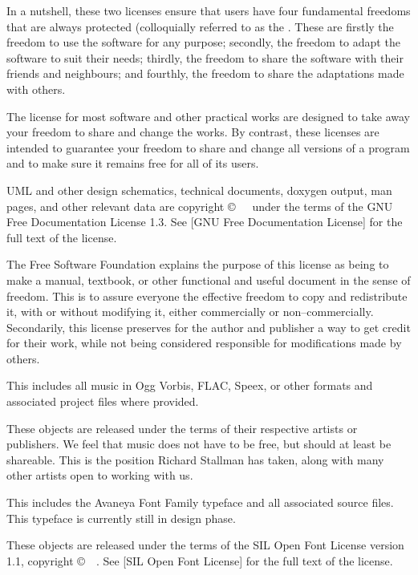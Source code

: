 In a nutshell, these two licenses ensure that users have four fundamental freedoms that are always protected (colloquially referred to as the . These are firstly the freedom to use the software for any purpose; secondly, the freedom to adapt the software to suit their needs; thirdly, the freedom to share the software with their friends and neighbours; and fourthly, the freedom to share the adaptations made with others. 

The license for most software and other practical works are designed to take away your freedom to share and change the works. By contrast, these licenses are intended to guarantee your freedom to share and change all versions of a program and to make sure it remains free for all of its users.


UML and other design schematics, technical documents, doxygen output, man pages, and other relevant data are copyright \copyright\ \CopyrightDates\ \CopyrightHolder\ under the terms of the GNU Free Documentation License 1.3. See [GNU Free Documentation License] for the full text of the license.

The Free Software Foundation explains the purpose of this license as being to make a manual, textbook, or other functional and useful document  in the sense of freedom. This is to assure everyone the effective freedom to copy and redistribute it, with or without modifying it, either commercially or non--commercially. Secondarily, this license preserves for the author and publisher a way to get credit for their work, while not being considered responsible for modifications made by others.


This includes all music in Ogg Vorbis, FLAC, Speex, or other formats and associated project files where provided.

These objects are released under the terms of their respective artists or publishers. We feel that music does not have to be free, but should at least be shareable. This is the position Richard Stallman has taken, along with many other artists open to working with us.


This includes the Avaneya Font Family typeface and all associated source files. This typeface is currently still in design phase.

These objects are released under the terms of the SIL Open Font License version 1.1, copyright \copyright\ \CopyrightDates\ \CopyrightHolder. See [SIL Open Font License] for the full text of the license.
\stopitemize

\StopChapter

